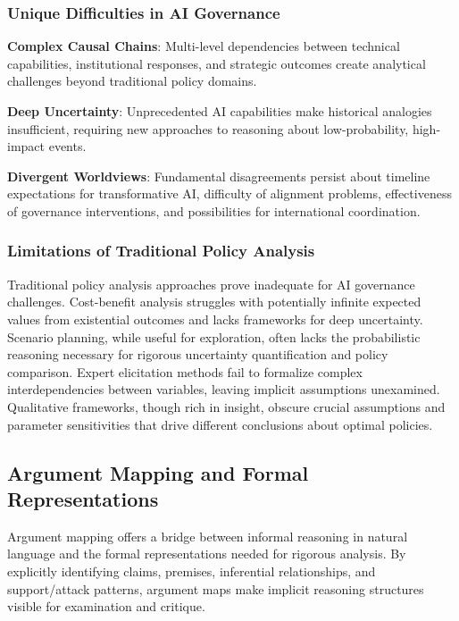 \documentclass[
  11pt,
  letterpaper,
]{book}
\begin{document}
\subsubsection{Unique Difficulties in AI
Governance}\label{sec-unique-difficulties}

\textbf{Complex Causal Chains}: Multi-level dependencies between
technical capabilities, institutional responses, and strategic outcomes
create analytical challenges beyond traditional policy domains.

\textbf{Deep Uncertainty}: Unprecedented AI capabilities make historical
analogies insufficient, requiring new approaches to reasoning about
low-probability, high-impact events.

\textbf{Divergent Worldviews}: Fundamental disagreements persist about
timeline expectations for transformative AI, difficulty of alignment
problems, effectiveness of governance interventions, and possibilities
for international coordination.

\subsubsection{Limitations of Traditional Policy
Analysis}\label{sec-traditional-limitations}

Traditional policy analysis approaches prove inadequate for AI
governance challenges. Cost-benefit analysis struggles with potentially
infinite expected values from existential outcomes and lacks frameworks
for deep uncertainty. Scenario planning, while useful for exploration,
often lacks the probabilistic reasoning necessary for rigorous
uncertainty quantification and policy comparison. Expert elicitation
methods fail to formalize complex interdependencies between variables,
leaving implicit assumptions unexamined. Qualitative frameworks, though
rich in insight, obscure crucial assumptions and parameter sensitivities
that drive different conclusions about optimal policies.

\subsection{Argument Mapping and Formal
Representations}\label{sec-argument-mapping}

Argument mapping offers a bridge between informal reasoning in natural
language and the formal representations needed for rigorous analysis. By
explicitly identifying claims, premises, inferential relationships, and
support/attack patterns, argument maps make implicit reasoning
structures visible for examination and critique.
\end{document}

